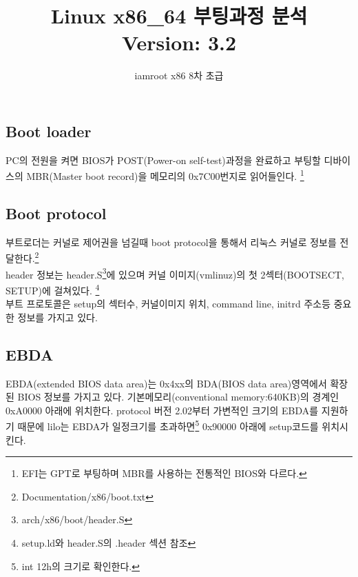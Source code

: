 \documentclass[a4paper,11pt]{report}
\begin{document}
\begin{CJK}{UTF8}{}

\title{Linux x86\_64 부팅과정 분석\\
Version: 3.2\\}
\author{
\and{iamroot x86 8차 초급}
}
\date{}


\maketitle

\chapter{Boot loader}
PC의 전원을 켜면 BIOS가 POST(Power-on self-test)과정을 완료하고 부팅할 디바이스의 MBR(Master boot record)을 메모리의 0x7C00번지로 읽어들인다.
\footnote{EFI는 GPT로 부팅하며 MBR를 사용하는 전통적인 BIOS와 다르다.}

\section{Boot protocol}
부트로더는 커널로 제어권을 넘길때 boot protocol을 통해서 리눅스 커널로 정보를 전달한다.\footnote{Documentation/x86/boot.txt}\\
header 정보는 header.S\footnote{arch/x86/boot/header.S}에 있으며 커널 이미지(vmlinuz)의 첫 2섹터(BOOTSECT, SETUP)에 걸쳐있다. \footnote{setup.ld와 header.S의 .header 섹션 참조}\\
부트 프로토콜은 setup의 섹터수, 커널이미지 위치, command line, initrd 주소등 중요한 정보를 가지고 있다.

\section{EBDA}
EBDA(extended BIOS data area)는 0x4xx의 BDA(BIOS data area)영역에서 확장된 BIOS 정보를 가지고 있다. 기본메모리(conventional memory:640KB)의 경계인 0xA0000 아래에 위치한다.
protocol 버전 2.02부터 가변적인 크기의 EBDA를 지원하기 때문에 lilo는 EBDA가 일정크기를 초과하면\footnote{int 12h의 크기로 확인한다.} 0x90000 아래에 setup코드를 위치시킨다.


\end{CJK}
\end{document}
